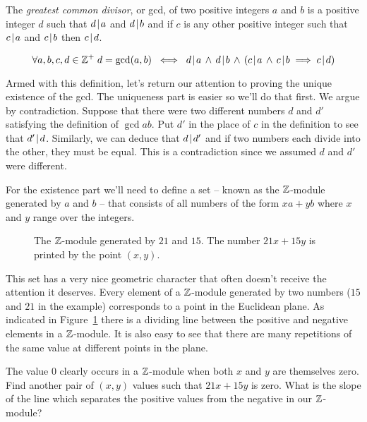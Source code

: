 \begin{defi}
The \emph{greatest common divisor}, or gcd, of two positive 
integers $a$ and $b$
is a positive integer $d$ such that $d \!\mid\! a$ and $d \!\mid\! b$ and if $c$ is any
other positive integer such that $c \!\mid\! a$ and $c \!\mid\! b$ then $c \!\mid\! d$.
  
\[ \forall a,b,c,d \in \Integers^+ \; d=\gcd{a}{b} \; \iff \;
d \divides a \, \land \, d \divides b \, \land \, (c \divides a \, \land \, c \divides b  \implies c \divides d)\]
\end{defi}

Armed with this definition, let's return our attention to proving the
unique existence of the gcd.  The uniqueness part is easier so we'll
do that first.  We argue by contradiction.  Suppose that there were
two different numbers $d$ and $d'$ satisfying the definition of $\gcd{a}{b}$.
Put $d'$ in the place of $c$ in the definition to see that $d' \!\mid\! d$.
Similarly, we can deduce that $d \!\mid\! d'$ and if two numbers each divide 
into the other, they must be equal.  This is a contradiction since we
assumed $d$ and $d'$ were different.

For the existence part we'll need to define a set -- known as the 
$\Integers$-module generated by $a$ and $b$ -- that consists of all 
numbers of the form $xa+yb$ where $x$ and $y$ range over the integers.

\begin{figure}[!hbtp] 
\begin{center}

\end{center}
\caption[A $\Integers$-module.]{The $\Integers$-module generated by $21$ and %
$15$. The number $21x+15y$ is printed by the point $(x,y)$.}
\label{fig:zmodule}
\end{figure}

This set has a very nice geometric character that often doesn't receive the
attention it deserves.  Every element of a $\Integers$-module generated
by two numbers ($15$ and $21$ in the example)
corresponds to a point in the Euclidean plane.  As indicated in 
Figure~\ref{fig:zmodule} there is a dividing line between the positive
and negative elements in a $\Integers$-module.  It is also easy to see
that there are many repetitions of the same value at different points 
in the plane.

\begin{exer}
The value $0$ clearly occurs in a $\Integers$-module when both
$x$ and $y$ are themselves zero.  Find another pair of $(x,y)$ 
values such that $21x+15y$ is zero.  What is the slope of
the line which separates the positive values from the negative
in our $\Integers$-module?
\end{exer} 

